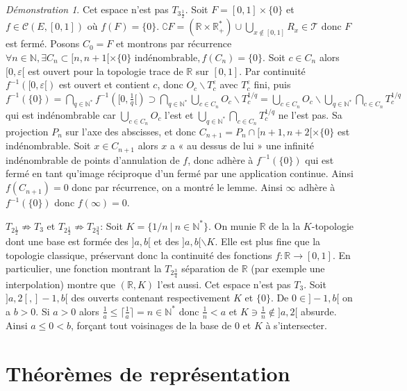 \documentclass[a4paper, 11pt, french]{book}
\newenvironment{itemise}{\itemize}{\enditemize}
\theoremstyle{plain} %
\theoremstyle{definition} %
\theoremstyle{remark} %
\newtheorem*{demonstration}{Démonstration}
\renewcommand{\setminus}{\backslash}
\newcommand{\1}{\mathds{1}}
\newcommand{\cont}{\mathcal{C}}
\newcommand{\infegal}{\leqslant}
\newcommand{\inv}[1]{#1^{-1}}
\newcommand{\N}{\mathbb{N}}
\newcommand{\R}{\mathbb{R}}
\newcommand\ens[2]{\{#1 \ |\ #2\}}
\begin{document}
\begin{demonstration}
\begin{itemise}
		Cet espace n'est pas $T_{3\frac{1}{2}}$.
		Soit $F=[0, 1]\times\{0\}$ et $f\in\cont(E, [0, 1])$ où $f(F)=\{0\}$.
		$\complement F=(\R\times\R_+^*)\cup\bigcup_{x\notin[0, 1]}R_x\in\mathscr{T}$ donc $F$ est fermé.
		Posons $C_0=F$ et montrons par récurrence $\forall n\in\N, \exists C_n\subset [n, n+1[\times\{0\}\text{ indénombrable}, f(C_n)=\{0\}$.
		Soit $c\in C_n$ alors $[0, \varepsilon[$ est ouvert pour la topologie trace de $\R$ sur $[0, 1]$.
		Par continuité $\inv{f}([0, \varepsilon[)$ est ouvert et contient $c$, donc $O_c\setminus T_c^\varepsilon$ avec $T_c^\varepsilon$ fini, puis $\inv{f}(\{0\})=\bigcap_{q\in\N^*}\inv{f}([0,\frac{1}{q}[)\supset\bigcap_{q\in\N^*}\bigcup_{c\in C_n}O_c\setminus T_c^{1/q}=\bigcup_{c\in C_n}O_c\setminus\bigcup_{q\in\N^*}\bigcap_{c\in C_n}T_c^{1/q}$ qui est indénombrable car $\bigcup_{c\in C_n}O_c$ l'est et $\bigcup_{q\in\N^*}\bigcap_{c\in C_n}T_c^{1/q}$ ne l'est pas.
		Sa projection $P_n$ sur l'axe des abscisses, et donc $C_{n+1}=P_n\cap[n+1, n+2[\times\{0\}$ est indénombrable.
		Soit $x\in C_{n+1}$ alors $x$ a « au dessus de lui » une infinité indénombrable de points d'annulation de $f$, donc adhère à $\inv{f}(\{0\})$ qui est fermé en tant qu'image réciproque d'un fermé par une application continue.
		Ainsi $f(C_{n+1})=0$ donc par récurrence, on a montré le lemme.
		Ainsi $\infty$ adhère à $\inv{f}(\{0\})$ donc $f(\infty)=0$.
		\item[$T_{2\frac{1}{2}}\not\Rightarrow T_3$ et $T_{2\frac{1}{2}}\not\Rightarrow T_{2\frac{3}{4}}$:]
		Soit $K=\ens{1/n}{n\in\N^*}$.
		On munie $\R$ de la la $K$-topologie dont une base est formée des $]a, b[$ et des $]a, b[\setminus K$.
						Elle est plus fine que la topologie classique, préservant donc la continuité des fonctions $f:\R\rightarrow[0, 1]$.
						En particulier, une fonction montrant la $T_{2\frac{3}{4}}$ séparation de $\R$ (par exemple une interpolation) montre que $(\R, K)$ l'est aussi.
						Cet espace n'est pas $T_3$.
						Soit $]a, 2[, ]-1, b[$ des ouverts contenant respectivement $K$ et $\{0\}$.
						De $0\in]-1, b[$ on a $b>0$.
						Si $a>0$ alors $\frac{1}{a}\infegal \lceil\frac{1}{a}\rceil=n\in\N^*$ donc $\frac{1}{n}<a$ et $K\ni\frac{1}{n}\notin]a, 2[$ absurde.
		Ainsi $a\infegal0<b$, forçant tout voisinages de la base de $0$ et $K$ à s'intersecter.
	\end{itemise}
\end{demonstration}

\section{Théorèmes de représentation}
\end{document}
